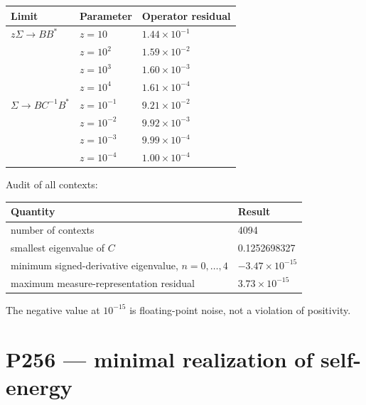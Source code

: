 \documentclass[11pt,a4paper,openany]{report}
\begin{document}
\begin{center}
\begingroup\small
\setlength{\tabcolsep}{2.5pt}
\renewcommand{\arraystretch}{1.16}
\begin{longtable}{@{}p{}p{}p{}@{}}
\toprule
\textbf{Limit} & \textbf{Parameter} & \textbf{Operator residual} \\
\midrule
\endhead
\(z\Sigma\to BB^\ast\) & \(z=10\) & \(1.44\times10^{-1}\) \\
 & \(z=10^2\) & \(1.59\times10^{-2}\) \\
 & \(z=10^3\) & \(1.60\times10^{-3}\) \\
 & \(z=10^4\) & \(1.61\times10^{-4}\) \\
\(\Sigma\to BC^{-1}B^\ast\) & \(z=10^{-1}\) & \(9.21\times10^{-2}\) \\
 & \(z=10^{-2}\) & \(9.92\times10^{-3}\) \\
 & \(z=10^{-3}\) & \(9.99\times10^{-4}\) \\
 & \(z=10^{-4}\) & \(1.00\times10^{-4}\) \\
\bottomrule
\end{longtable}
\endgroup
\end{center}

Audit of all contexts:

\begin{center}
\begingroup\small
\setlength{\tabcolsep}{2.5pt}
\renewcommand{\arraystretch}{1.16}
\begin{longtable}{@{}p{}p{}@{}}
\toprule
\textbf{Quantity} & \textbf{Result} \\
\midrule
\endhead
number of contexts & 4094 \\
smallest eigenvalue of \(C\) & 0.1252698327 \\
minimum signed-derivative eigenvalue, \(n=0,\ldots,4\) & \(-3.47\times10^{-15}\) \\
maximum measure-representation residual & \(3.73\times10^{-15}\) \\
\bottomrule
\end{longtable}
\endgroup
\end{center}

The negative value at \(10^{-15}\) is floating-point noise, not a violation of positivity.

\chapter{P256 --- minimal realization of self-energy}
\end{document}
